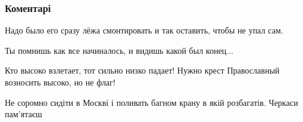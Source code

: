  
 
 
 
 
\subsubsection{Коментарі}

\begin{itemize}
 
Надо было его сразу лёжа смонтировать и так оставить, чтобы не упал сам.

 
Ты помнишь как все начиналось, и видишь какой был конец...

 
Кто высоко взлетает, тот сильно низко падает! Нужно крест Православный возносить высоко, но не флаг!

 
Не соромно сидіти в Москві і поливать багном крану в якій розбагатів. Черкаси пам'ятаєш

 

\end{itemize}
